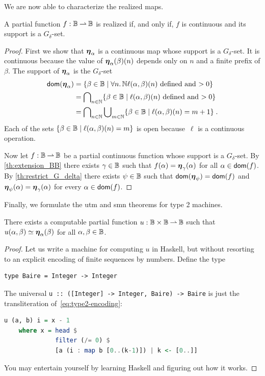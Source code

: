 We are now able to characterize the realized maps.

\begin{theorem}
  A partial function $f: \mathbb{B} \mathbin{\rightharpoonup} \mathbb{B}$ is realized if, and only
  if, $f$ is continuous and its support is a $G_\delta$-set.
\end{theorem}

\begin{proof}
  First we show that $\text{\boldmath{$\eta$}}_\alpha$ is a continuous map whose support
  is a $G_\delta$-set. It is continuous because the value of
  $\text{\boldmath{$\eta$}}_{\alpha}(\beta)(n)$ depends only on $n$ and a finite prefix of
  $\beta$. The support of $\text{\boldmath{$\eta$}}_\alpha$ is the $G_\delta$-set
  \begin{align*}
    \mathsf{dom}(\text{\boldmath{$\eta$}}_\alpha)
    &= \{\beta \in \mathbb{B} \mid
      \forall n .\,{\mathbb{N}}{
        \ell(\alpha, \beta)(n) \ \text{defined and $> 0$}}\} \\
    &= \bigcap\nolimits_{n \in \mathbb{N}}
      \{\beta \in \mathbb{B} \mid
        \ell(\alpha, \beta)(n) \ \text{defined and $> 0$}\} \\
    &=  \bigcap\nolimits_{n \in \mathbb{N}}
        \bigcup\nolimits_{m \in \mathbb{N}}
          \{\beta \in \mathbb{B} \mid
          \ell(\alpha, \beta)(n) = m + 1\} \;.
  \end{align*}
  Each of the sets $\{\beta \in \mathbb{B} \mid \ell(\alpha, \beta)(n) = m\}$ is open because~$\ell$ is a continuous operation.
  
  Now let $f: \mathbb{B} \mathbin{\rightharpoonup} \mathbb{B}$ be a partial continuous function
  whose support is a $G_\delta$-set. By \cref{th:extension_BB}
  there exists $\gamma \in \mathbb{B}$ such that $f(\alpha) =
  \text{\boldmath{$\eta$}}_{\gamma}(\alpha)$ for all $\alpha \in \mathsf{dom}(f)$. By
  \cref{th:restrict_G_delta} there exists $\psi \in \mathbb{B}$ such
  that $\mathsf{dom}(\text{\boldmath{$\eta$}}_\psi) = \mathsf{dom}(f)$ and $\text{\boldmath{$\eta$}}_{\psi}(\alpha) =
  \text{\boldmath{$\eta$}}_{\gamma}(\alpha)$ for every $\alpha \in \mathsf{dom}(f)$.
\end{proof}

Finally, we formulate the utm and smn theorems for type 2 machines.

\begin{theorem}
  There exists a computable partial function $u : \mathbb{B} \times
  \mathbb{B} \mathbin{\rightharpoonup} \mathbb{B}$ such that $u(\alpha, \beta) \simeq
  \text{\boldmath{$\eta$}}_{\alpha}(\beta)$ for all $\alpha, \beta \in \mathbb{B}$.
\end{theorem}

\begin{proof}
  Let us write a machine for computing $u$ in Haskell, but without
  resorting to an explicit encoding of finite sequences by numbers.
  Define the type
\begin{lstlisting}
type Baire = Integer -> Integer
\end{lstlisting}
  The universal \lstinline!u :: ([Integer] -> Integer, Baire) -> Baire! %
  is just the transliteration of~\eqref{eq:type2-encoding}:
\begin{lstlisting}[language=Haskell]
u (a, b) i = x - 1
    where x = head $
              filter (/= 0) $
              [a (i : map b [0..(k-1)]) | k <- [0..]]
\end{lstlisting}
  You may entertain yourself by learning Haskell and figuring out how
  it works.
\end{proof}

